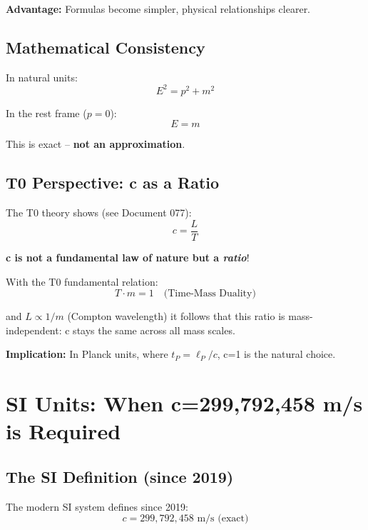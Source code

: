 	\textbf{Advantage:} Formulas become simpler, physical relationships clearer.
	
	\subsection{Mathematical Consistency}
	
	In natural units:
	\begin{equation}
		E^2 = p^2 + m^2
	\end{equation}
	
	In the rest frame ($p=0$):
	\begin{equation}
		E = m
	\end{equation}
	
	This is exact -- \textbf{not an approximation}.
	
	\subsection{T0 Perspective: c as a Ratio}
	
	The T0 theory shows (see Document 077):
	\begin{equation}
		c = \frac{L}{T}
	\end{equation}
	
	\textbf{c is not a fundamental law of nature but a \emph{ratio}}!
	
	With the T0 fundamental relation:
	\begin{equation}
		T \cdot m = 1 \quad \text{(Time-Mass Duality)}
	\end{equation}
	
	and $L \propto 1/m$ (Compton wavelength) it follows that this ratio is mass-independent: c stays the same across all mass scales.
	
	\textbf{Implication:} In Planck units, where $t_P = \ell_P/c$, c=1 is the natural choice.
	
	\section{SI Units: When c=299,792,458 m/s is Required}
	
	\subsection{The SI Definition (since 2019)}
	
	The modern SI system defines since 2019:
	\begin{equation}
		\boxed{c = 299,792,458 \text{ m/s} \text{ (exact)}}
	\end{equation}
	
